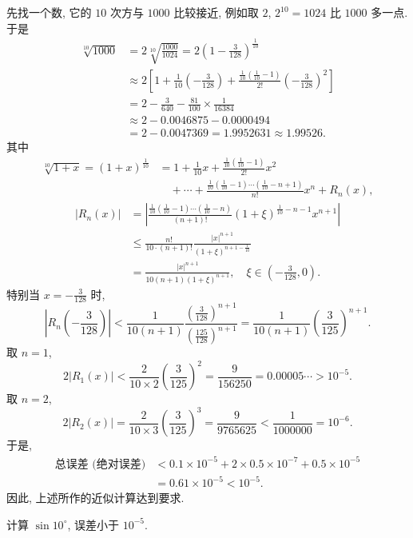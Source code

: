 \begin{solution}
先找一个数, 它的 $10$ 次方与 $1000$ 比较接近, 例如取 $2$, $2^{10} = 1024$ 比 $1000$ 多一点. 于是
\begin{align*}
\sqrt[10]{1000}
&= 2\sqrt[10]{\frac{1000}{1024}}=2\left(1-\frac{3}{128}\right)^{\frac{1}{10}} \\
&\approx 2\left[1+\frac{1}{10}\left(-\frac{3}{128}\right)+\frac{\frac{1}{10}\left(\frac{1}{10}-1\right)}{2!}\left(-\frac{3}{128}\right)^{2}\right] \\
&= 2-\frac{3}{640}-\frac{81}{100}\times\frac{1}{16384} \\
&\approx 2-0.0046875-0.0000494 \\
&= 2-0.0047369=1.9952631\approx 1.99526.
\end{align*}
其中
\begin{align*}
\sqrt[10]{1+x}=(1+x)^{\frac{1}{10}}
&= 1+\frac{1}{10}x+\frac{\frac{1}{10}\left(\frac{1}{10}-1\right)}{2!}x^{2} \\
&\quad +\cdots+\frac{\frac{1}{10}\left(\frac{1}{10}-1\right)\cdots\left(\frac{1}{10}-n+1\right)}{n!}x^{n}+R_{n}(x),
\end{align*}
\begin{align*}
|R_{n}(x)|
&= \left|\frac{\frac{1}{10}\left(\frac{1}{10}-1\right)\cdots\left(\frac{1}{10}-n\right)}{(n+1)!}(1+\xi)^{\frac{1}{10}-n-1}x^{n+1}\right| \\
&\leqslant \frac{n!}{10\cdot(n+1)!}\frac{|x|^{n+1}}{(1+\xi)^{n+1-\frac{1}{10}}} \\
&= \frac{|x|^{n+1}}{10(n+1)(1+\xi)^{n+1}},\quad\xi\in\left(-\frac{3}{128},0\right).
\end{align*}
特别当 $x = -\frac{3}{128}$ 时,
\[
\left|R_{n}\left(-\frac{3}{128}\right)\right|<\frac{1}{10(n+1)}\frac{\left(\frac{3}{128}\right)^{n+1}}{\left(\frac{125}{128}\right)^{n+1}}=\frac{1}{10(n+1)}\left(\frac{3}{125}\right)^{n+1}.
\]
取 $n=1$,
\[
2|R_{1}(x)|<\frac{2}{10\times 2}\left(\frac{3}{125}\right)^{2}=\frac{9}{156250}=0.00005\cdots>10^{-5}.
\]
取 $n=2$,
\[
2|R_{2}(x)|=\frac{2}{10\times 3}\left(\frac{3}{125}\right)^{3}=\frac{9}{9765625}<\frac{1}{1000000}=10^{-6}.
\]
于是,
\begin{align*}
\text{总误差 (绝对误差)}
&< 0.1\times 10^{-5}+2\times 0.5\times 10^{-7}+0.5\times 10^{-5} \\
&= 0.61\times 10^{-5}<10^{-5}.
\end{align*}
因此, 上述所作的近似计算达到要求.
\end{solution}

\begin{example}\label{ex:4.2.15}
计算 $\sin 10^\circ$, 误差小于 $10^{-5}$.
\end{example}

